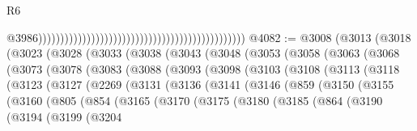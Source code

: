\begin{lexlean}{R6}
\begin{coremodule}
                                                                                                  @3986)))))))))))))))))))))))))))))))))))))))))))))))
@4082 := @3008
    (@3013
      (@3018
        (@3023
          (@3028
            (@3033
              (@3038
                (@3043
                  (@3048
                    (@3053
                      (@3058
                        (@3063
                          (@3068
                            (@3073
                              (@3078
                                (@3083
                                  (@3088
                                    (@3093
                                      (@3098
                                        (@3103
                                          (@3108
                                            (@3113
                                              (@3118
                                                (@3123
                                                  (@3127
                                                    (@2269
                                                      (@3131
                                                        (@3136
                                                          (@3141
                                                            (@3146
                                                              (@859
                                                                (@3150
                                                                  (@3155
                                                                    (@3160
                                                                      (@805
                                                                        (@854
                                                                          (@3165
                                                                            (@3170
                                                                              (@3175
                                                                                (@3180
                                                                                  (@3185
                                                                                    (@864
                                                                                      (@3190
                                                                                        (@3194
                                                                                          (@3199
                                                                                            (@3204

\end{coremodule}
\end{lexlean}
